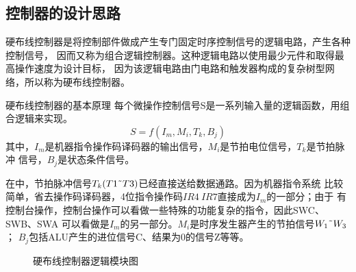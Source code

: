 \subsection{控制器的设计思路}
硬布线控制器是将控制部件做成产生专门固定时序控制信号的逻辑电路，产生各种控制信号，
因而又称为组合逻辑控制器。这种逻辑电路以使用最少元件和取得最高操作速度为设计目标，
因为该逻辑电路由门电路和触发器构成的复杂树型网络，所以称为硬布线控制器。
\par{硬布线控制器的基本原理}
每个微操作控制信号S是一系列输入量的逻辑函数，用组合逻辑来实现。
\begin{equation}
    S=f(I_m,M_i,T_k,B_j)
\end{equation}
其中，$I_m$是机器指令操作码译码器的输出信号，$M_i$是节拍电位信号，$T_k$是节拍脉冲
信号，$B_j$是状态条件信号。
\par
在\tec 中，节拍脉冲信号$T_k(T1\wave T3)$已经直接送给数据通路。因为机器指令系统
比较简单，省去操作码译码器，4位指令操作码$IR4~IR7$直接成为$I_m$的一部分；由于
\tec 有控制台操作，控制台操作可以看做一些特殊的功能复杂的指令，因此SWC、SWB、SWA
可以看做是$I_m$的另一部分。$M_i$是时序发生器产生的节拍信号$W_1\wave W_3$；
$B_j$包括ALU产生的进位信号C、结果为0的信号Z等等。
\begin{figure}[htbp]
    \label{硬布线控制器逻辑模块图}
    \caption{硬布线控制器逻辑模块图}
\end{figure}